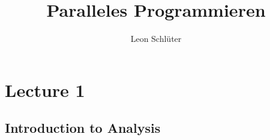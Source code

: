 \documentclass[a4paper,10pt]{article}
\title{Paralleles Programmieren}
\author{Leon Schlüter}
\begin{document}
\maketitle
    \section{Lecture 1}
    \subsection{Introduction to Analysis}
\end{document}

